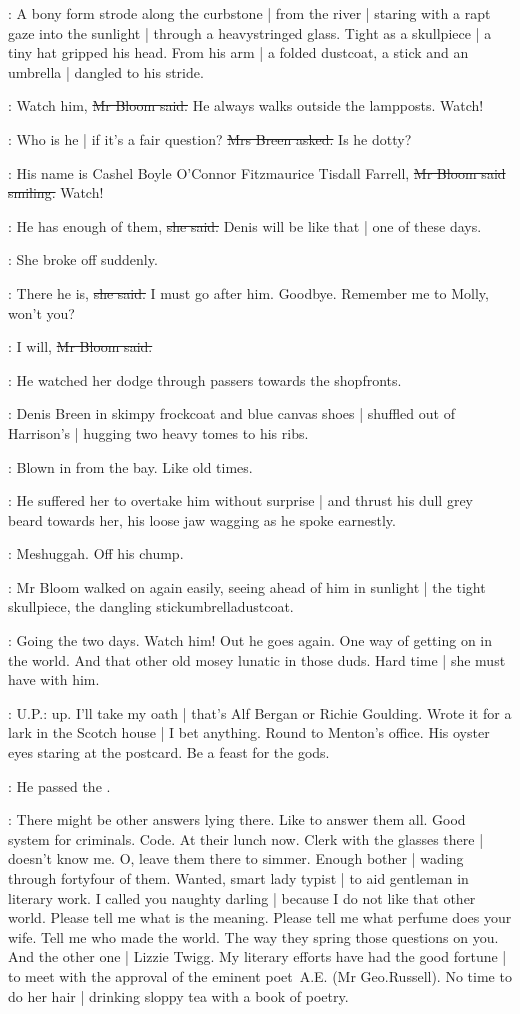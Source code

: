 :
A bony form strode along the curbstone |
from the river |
staring with a rapt gaze into the sunlight |
through a heavystringed glass.
Tight as a skullpiece |
a tiny hat gripped his head.
From his arm |
a folded dustcoat, a stick and an umbrella |
dangled to his stride.

\Bloom:
Watch him,
\sout{Mr Bloom said.}
He always walks outside the lampposts.
Watch!%

\josie:
Who is he |
if it's a fair question?
\sout{Mrs Breen asked.}
Is he dotty?

\Bloom:
His name is Cashel Boyle O'Connor Fitzmaurice Tisdall Farrell,
\sout{Mr Bloom said smiling.}
Watch!

\josie:
He has enough of them,
\sout{she said.}
Denis will be like that |
one of these days.

:
She broke off suddenly.

\josie:
There he is,
\sout{she said.}
I must go after him.
Goodbye.
Remember me to Molly,
won't you?

\Bloom:
I will,
\sout{Mr Bloom said.}

:
He watched her dodge through passers towards the shopfronts.

:
Denis Breen in skimpy frockcoat and blue canvas shoes |
shuffled out of Harrison's |
hugging two heavy tomes to his ribs.

\BloomInt:
Blown in from the bay.
Like old times.

:
He suffered her to overtake him without surprise |
and thrust his dull grey beard towards her,
his loose jaw wagging as he spoke earnestly.

\BloomInt:
Meshuggah.
Off his chump.

:
Mr Bloom walked on again easily,
seeing ahead of him in sunlight |
the tight skullpiece,
the dangling stickumbrelladustcoat.

\BloomInt:
Going the two days.
Watch him!
Out he goes again.
One way of getting on in the world.
And that other old mosey lunatic in those duds.
Hard time |
she must have with him.

\BloomInt:
U.P.:
up.
I'll take my oath |
that's Alf Bergan or Richie Goulding.
Wrote it for a lark in the Scotch house |
I bet anything.
Round to Menton's office.
His oyster eyes staring at the postcard.
Be a feast for the gods.

:
He passed the .

\BloomInt:
There might be other answers lying there.
Like to answer them all.
Good system for criminals.
Code.
At their lunch now.
Clerk with the glasses there |
doesn't know me.
O, leave them there to simmer.
Enough bother |
wading through fortyfour of them.
Wanted,
smart lady typist |
to aid gentleman in literary work.
I called you naughty darling |
because I do not like that other world.
Please tell me what is the meaning.
Please tell me what perfume does your wife.
Tell me who made the world.
The way they spring those questions on you.
And the other one |
Lizzie Twigg.
My literary efforts have had the good fortune |
to meet with the approval of the eminent poet~A.E.\@
(Mr Geo.\@ Russell).
No time to do her hair |
drinking sloppy tea with a book of poetry.

